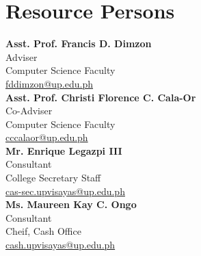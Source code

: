 %
%
%                 

\chapter{Resource Persons}
\label{sec:appendixb}

%
%
%
%

%
%

\newcommand{\resperson}[4]{\textbf{#1} \\ #2 \\ #3 \\ \url{#4}\vspace{0.5em}\\}

\resperson{Asst. Prof. Francis D. Dimzon}{Adviser}{Computer Science Faculty}{fddimzon@up.edu.ph}

\resperson{Asst. Prof. Christi Florence C. Cala-Or}{Co-Adviser}{Computer Science Faculty}{cccalaor@up.edu.ph}

\resperson{Mr. Enrique Legazpi III}{Consultant}{College Secretary Staff}{cas-sec.upvisayas@up.edu.ph}

\resperson{Ms. Maureen Kay C. Ongo}{Consultant}{Cheif, Cash Office}{cash.upvisayas@up.edu.ph}